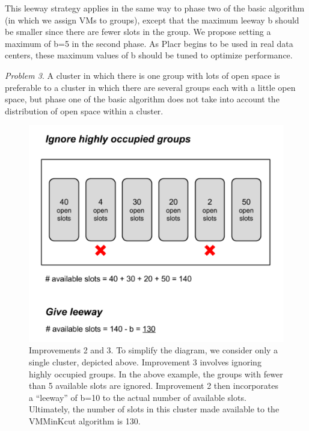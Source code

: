 \documentclass[11pt]{article}
\begin{document}
This leeway strategy applies in the same way to phase two of the basic algorithm (in which we assign VMs to groups), except that the maximum leeway b should be smaller since there are fewer slots in the group.  We propose setting a maximum of b=5 in the second phase.  As Placr begins to be used in real data centers, these maximum values of b should be tuned to optimize performance.

\textit{Problem 3}. A cluster in which there is one group with lots of open space is preferable to a cluster in which there are several groups each with a little open space, but phase one of the basic algorithm does not take into account the distribution of open space within a cluster.

\begin{figure}
  \centering
\includegraphics[scale=0.7]{occupiedgroups.png}

 \caption{ Improvements 2 and 3.  To simplify the diagram, we consider only a single cluster, depicted above.  Improvement 3 involves ignoring highly occupied groups.  In the above example, the groups with fewer than 5 available slots are ignored.  Improvement 2 then incorporates a “leeway” of b=10 to the actual number of available slots.  Ultimately, the number of slots in this cluster made available to the VMMinKcut algorithm is 130.}

\end{figure}
\end{document}
